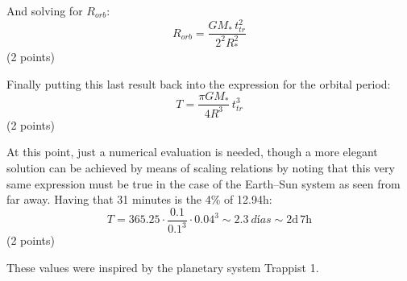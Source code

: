 \begin{description}
And solving for $R_{orb}$:
\[ R_{orb} = \frac{GM_*\,t_{tr}^2}{2^2 R_*^2} \]
\hfill(2 points)

Finally putting this last result back into the expression for the orbital
period:
\[ T = \frac{\pi G M_*}{4R^3}\,t_{tr}^3 \]
\hfill(2 points)

At this point, just a numerical evaluation is needed, though a more elegant
solution can be achieved by means of scaling relations by noting that this
very same expression must be true in the case of the Earth--Sun system as seen
from far away. Having that 31 minutes is the 4\% of 12.94h:
\[ T = 365.25\cdot\frac{0.1}{0.1^3}\cdot 0.04^3
     \sim 2.3\ \textit{d\'ias} %
     \sim 2\mathrm{d}\,7\mathrm{h} \]
\hfill(2 points)

These values were inspired by the planetary system Trappist 1.
\end{description}
